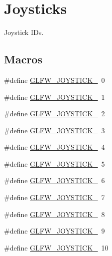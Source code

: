 \hypertarget{group__joysticks}{}\section{Joysticks}
\label{group__joysticks}


Joystick I\+Ds.  


\subsection*{Macros}
\begin{DoxyCompactItemize}
\item 
\#define \mbox{\hyperlink{group__joysticks_ga34a0443d059e9f22272cd4669073f73d}{G\+L\+F\+W\+\_\+\+J\+O\+Y\+S\+T\+I\+C\+K\+\_}}~0
\item 
\#define \mbox{\hyperlink{group__joysticks_ga6eab65ec88e65e0850ef8413504cb50c}{G\+L\+F\+W\+\_\+\+J\+O\+Y\+S\+T\+I\+C\+K\+\_}}~1
\item 
\#define \mbox{\hyperlink{group__joysticks_gae6f3eedfeb42424c2f5e3161efb0b654}{G\+L\+F\+W\+\_\+\+J\+O\+Y\+S\+T\+I\+C\+K\+\_}}~2
\item 
\#define \mbox{\hyperlink{group__joysticks_ga97ddbcad02b7f48d74fad4ddb08fff59}{G\+L\+F\+W\+\_\+\+J\+O\+Y\+S\+T\+I\+C\+K\+\_}}~3
\item 
\#define \mbox{\hyperlink{group__joysticks_gae43281bc66d3fa5089fb50c3e7a28695}{G\+L\+F\+W\+\_\+\+J\+O\+Y\+S\+T\+I\+C\+K\+\_}}~4
\item 
\#define \mbox{\hyperlink{group__joysticks_ga74771620aa53bd68a487186dea66fd77}{G\+L\+F\+W\+\_\+\+J\+O\+Y\+S\+T\+I\+C\+K\+\_}}~5
\item 
\#define \mbox{\hyperlink{group__joysticks_ga20a9f4f3aaefed9ea5e66072fc588b87}{G\+L\+F\+W\+\_\+\+J\+O\+Y\+S\+T\+I\+C\+K\+\_}}~6
\item 
\#define \mbox{\hyperlink{group__joysticks_ga21a934c940bcf25db0e4c8fe9b364bdb}{G\+L\+F\+W\+\_\+\+J\+O\+Y\+S\+T\+I\+C\+K\+\_}}~7
\item 
\#define \mbox{\hyperlink{group__joysticks_ga87689d47df0ba6f9f5fcbbcaf7b3cecf}{G\+L\+F\+W\+\_\+\+J\+O\+Y\+S\+T\+I\+C\+K\+\_}}~8
\item 
\#define \mbox{\hyperlink{group__joysticks_gaef55389ee605d6dfc31aef6fe98c54ec}{G\+L\+F\+W\+\_\+\+J\+O\+Y\+S\+T\+I\+C\+K\+\_}}~9
\item 
\#define \mbox{\hyperlink{group__joysticks_gae7d26e3df447c2c14a569fcc18516af4}{G\+L\+F\+W\+\_\+\+J\+O\+Y\+S\+T\+I\+C\+K\+\_}}~10
\item 

\end{DoxyCompactItemize}

